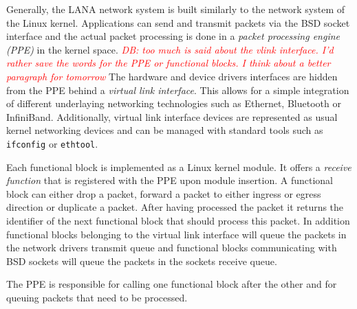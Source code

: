 \documentclass{sig-alternate}
\newcommand{\daniel}[1]{\textcolor{red}{\emph{DB: #1}}}
\begin{document}
Generally, the LANA network system is built similarly to the network system of the Linux kernel.
Applications can send and transmit packets via the BSD socket interface and the actual packet processing is done in a \textit{packet processing engine (PPE)} in the kernel space.
\daniel{too much is said about the vlink interface. I'd rather save the words for the PPE or functional blocks. I think about a better paragraph for tomorrow}
The hardware and device drivers interfaces are hidden from the PPE behind a \textit{virtual link interface}. This allows for a simple integration of different underlaying networking technologies such as Ethernet, Bluetooth or InfiniBand. Additionally, virtual link interface devices are represented as usual kernel networking devices and can be managed with standard tools such as \texttt{ifconfig} or \texttt{ethtool}.

Each functional block is implemented as a Linux kernel module. It offers a \textit{receive function} that is registered with the PPE upon module insertion. 
A functional block can either drop a packet, forward a packet to either ingress or egress direction or duplicate a packet. After having processed the packet it returns the identifier of the next functional block that should process this packet. In addition functional blocks belonging to the virtual link interface will queue the packets in the network drivers transmit queue and functional blocks communicating with BSD sockets will queue the packets in the sockets receive queue.

The PPE is responsible for calling one functional block after the other and for queuing packets that need to be processed.


\end{document}
